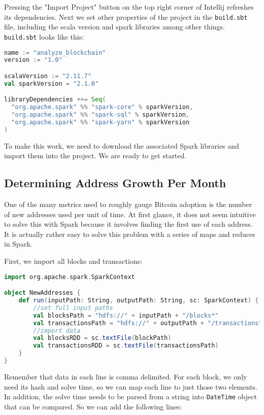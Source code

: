 \documentclass[9pt,twocolumn,twoside]{idsi}
\begin{document}
Pressing the "Import Project" button on the top right corner of Intellij refreshes its dependencies. Next we set other properties of the project in the \lstinline{build.sbt} file, including the scala version and spark libraries among other things. \lstinline{build.sbt} looks like this:

\begin{lstlisting}[language=Scala]
name := "analyze_blockchain"
version := "1.0"

scalaVersion := "2.11.7"
val sparkVersion = "2.1.0"

libraryDependencies ++= Seq(
  "org.apache.spark" %% "spark-core" % sparkVersion,
  "org.apache.spark" %% "spark-sql" % sparkVersion,
  "org.apache.spark" %% "spark-yarn" % sparkVersion
)
\end{lstlisting}

To make this work, we need to download the associated Spark libraries and import them into the project. We are ready to get started.

\subsection{Determining Address Growth Per Month}
One of the many metrics used to roughly gauge Bitcoin adoption is the number of new addresses used per unit of time. At first glance, it does not seem intuitive to solve this with Spark because it involves finding the first use of each address. It is actually rather easy to solve this problem with a series of maps and reduces in Spark.

First, we import all blocks and transactions:

\begin{lstlisting}[language=Scala]
import org.apache.spark.SparkContext

object NewAddresses {
    def run(inputPath: String, outputPath: String, sc: SparkContext) {
        //set full input paths
        val blocksPath = "hdfs://" + inputPath + "/blocks*"
        val transactionsPath = "hdfs://" + outputPath + "/transactions*"
        //import data
        val blocksRDD = sc.textFile(blockPath)
        val transactionsRDD = sc.textFile(transactionsPath)
    }
}
\end{lstlisting}

Remember that data in each line is comma delimited. For each block, we only need its hash and solve time, so we can map each line to just those two elements. In addition, the solve time needs to be parsed from a string into \lstinline{DateTime} object that can be compared. So we can add the following lines:
\end{document}
